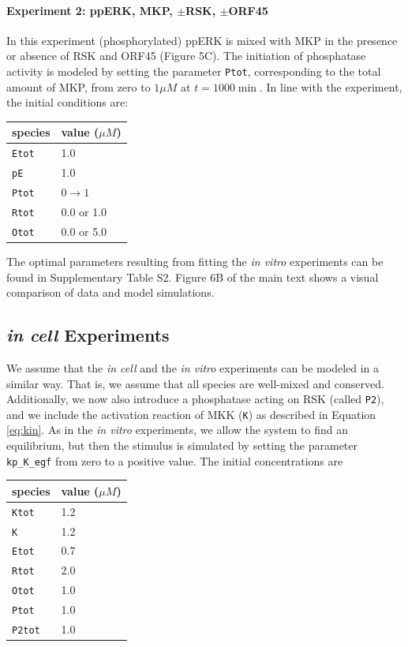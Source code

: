\documentclass[12pt]{article}
\begin{document}
	\paragraph{Experiment 2: ppERK, MKP, $\pm$RSK, $\pm$ORF45}
	
	In this experiment (phosphorylated) ppERK is mixed with MKP in the
	presence or absence of RSK and ORF45 (Figure 5C). The initiation of
	phosphatase activity is modeled by setting the parameter \texttt{Ptot},
	corresponding to the total amount of MKP, from zero to $1\mu M$ at
	$t=1000\min$. In line with the experiment, the initial conditions
	are: 
	\begin{center}
		\begin{tabular}{ll}
			species  & value ($\mu M$)\\
			\midrule 
			\texttt{Etot}  & 1.0\\
			\texttt{pE}  & 1.0\\
			\texttt{Ptot}  & $0\rightarrow1$\\
			\texttt{Rtot}  & 0.0 or 1.0\\
			\texttt{Otot}  & 0.0 or 5.0\\
		\end{tabular}
		\par\end{center}
	
	The optimal parameters resulting from fitting the \emph{in vitro}
	experiments can be found in Supplementary Table S2. Figure 6B of the
	main text shows a visual comparison of data and model simulations.
	
	\subsection{\textit{in cell} Experiments}
	
	\label{ss:incell} We assume that the \textit{in cell} and the \textit{in
		vitro} experiments can be modeled in a similar way. That is, we assume
	that all species are well-mixed and conserved. Additionally, we now
	also introduce a phosphatase acting on RSK (called \texttt{P2}),
	and we include the activation reaction of MKK (\texttt{K}) as described
	in Equation \eqref{eq:kin}. As in the \textit{in vitro} experiments,
	we allow the system to find an equilibrium, but then the stimulus
	is simulated by setting the parameter \texttt{kp\_K\_egf}
	from zero to a positive value. The initial concentrations are 
	\begin{center}
		\begin{tabular}{ll}
			species  & value ($\mu M$)\\
			\midrule 
			\texttt{Ktot}  & 1.2\\
			\texttt{K}  & 1.2 \\
			\texttt{Etot}  & 0.7\\
			\texttt{Rtot}  & 2.0\\			
			\texttt{Otot}  & 1.0\\
			\texttt{Ptot}  & 1.0\\
			\texttt{P2tot}  & 1.0\\
		\end{tabular}
		\par\end{center}
	
\end{document}
